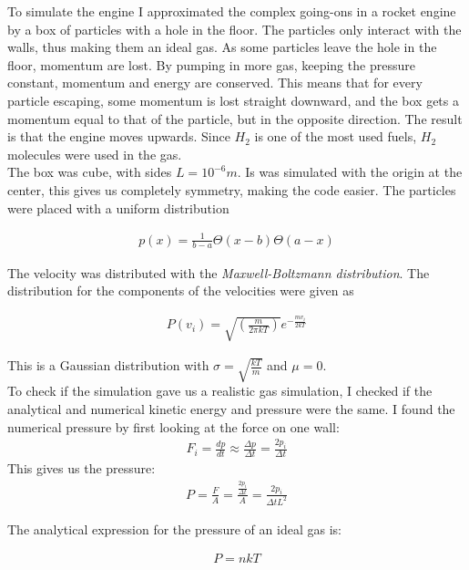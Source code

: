 \documentclass[a4paper, 10pt]{article}
\begin{document}
To simulate the engine I approximated the complex going-ons in a rocket engine by a box of particles with a hole in the floor. The particles only interact with the walls, thus making them an ideal gas. As some particles leave the hole in the floor, momentum are lost. By pumping in more gas, keeping the pressure constant, momentum and energy are conserved. This means that for every particle escaping, some momentum is lost straight downward, and the box gets a momentum equal to that of the particle, but in the opposite direction. The result is that the engine moves upwards. Since $H_2$ is one of the most used fuels, $H_2$ molecules were used in the gas.\\

The box was cube, with sides $L = 10^{-6}m$. Is was simulated with the origin at the center, this gives us completely symmetry, making the code easier. The particles were placed with a uniform distribution 

\begin{align}
p(x) = \frac{1}{b-a}\Theta(x-b)\Theta(a-x)
\end{align}

The velocity was distributed with the \textit{Maxwell-Boltzmann distribution}. The distribution for the components of the velocities were given as \cite{1a}

\begin{align}
P(v_i) = \sqrt{\left( \frac{m}{2 \pi k T} \right)} e^{-\frac{m v_i}{2kT}}
\end{align}

This is a Gaussian distribution with $\sigma = \sqrt{ \frac{kT}{m}}$
and $\mu = 0$.\\

To check if the simulation gave us a realistic gas simulation, I checked if the analytical and numerical kinetic energy and pressure were the same. I found the numerical pressure by first looking at the force on one wall:
\begin{align}
F_i = \frac{dp}{dt} \approx \frac{\Delta p}{\Delta t} = \frac{2p_i}{\Delta t}
\end{align}
This gives us the pressure:
\begin{align}
P = \frac{F}{A} = \frac{\frac{2p_i}{\Delta t}}{A} = \frac{2p_i}{\Delta t L^{2}}
\end{align}

The analytical expression for the pressure of an ideal gas is:

\begin{align}
P = nkT
\end{align}
\end{document}
